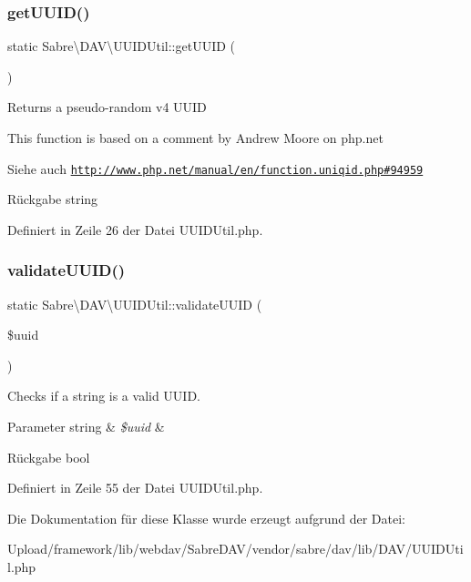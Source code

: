 \subsubsection{\texorpdfstring{get\+U\+U\+I\+D()}{getUUID()}}
{\footnotesize\ttfamily static Sabre\textbackslash{}\+D\+A\+V\textbackslash{}\+U\+U\+I\+D\+Util\+::get\+U\+U\+ID (\begin{DoxyParamCaption}{ }\end{DoxyParamCaption})\hspace{0.3cm}{\ttfamily [static]}}

Returns a pseudo-\/random v4 U\+U\+ID

This function is based on a comment by Andrew Moore on php.\+net

\begin{DoxySeeAlso}{Siehe auch}
\href{http://www.php.net/manual/en/function.uniqid.php#94959}{\tt http\+://www.\+php.\+net/manual/en/function.\+uniqid.\+php\#94959} 
\end{DoxySeeAlso}
\begin{DoxyReturn}{Rückgabe}
string 
\end{DoxyReturn}


Definiert in Zeile 26 der Datei U\+U\+I\+D\+Util.\+php.

\mbox{\label{class_sabre_1_1_d_a_v_1_1_u_u_i_d_util_a78de4443f0efff2f057075ce1bf52176}} 
\subsubsection{\texorpdfstring{validate\+U\+U\+I\+D()}{validateUUID()}}
{\footnotesize\ttfamily static Sabre\textbackslash{}\+D\+A\+V\textbackslash{}\+U\+U\+I\+D\+Util\+::validate\+U\+U\+ID (\begin{DoxyParamCaption}\item[{}]{\$uuid }\end{DoxyParamCaption})\hspace{0.3cm}{\ttfamily [static]}}

Checks if a string is a valid U\+U\+ID.


\begin{DoxyParams}[1]{Parameter}
string & {\em \$uuid} & \\
\hline
\end{DoxyParams}
\begin{DoxyReturn}{Rückgabe}
bool 
\end{DoxyReturn}


Definiert in Zeile 55 der Datei U\+U\+I\+D\+Util.\+php.



Die Dokumentation für diese Klasse wurde erzeugt aufgrund der Datei\+:\begin{DoxyCompactItemize}
\item 
Upload/framework/lib/webdav/\+Sabre\+D\+A\+V/vendor/sabre/dav/lib/\+D\+A\+V/U\+U\+I\+D\+Util.\+php\end{DoxyCompactItemize}
